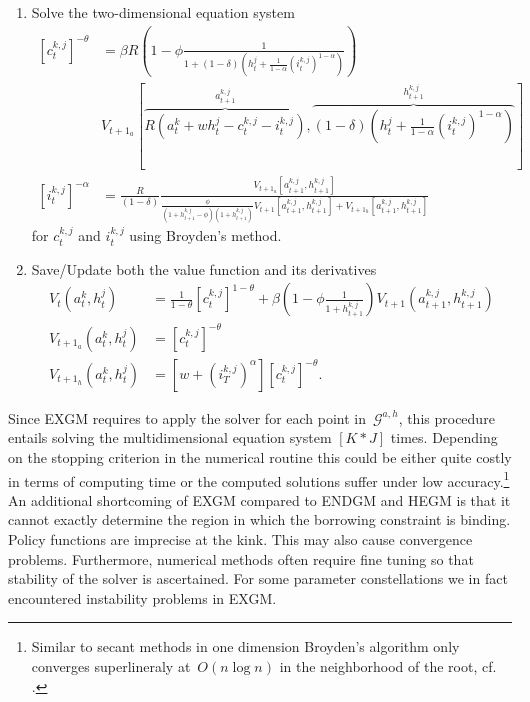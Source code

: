 \documentclass[a4paper,12pt]{article}%
\begin{document}
\begin{enumerate}
\begin{enumerate}
\item \label{EXGM interp}Solve the two-dimensional equation system
\begin{align*}
\left[  c_{t}^{k,j}\right]  ^{-\theta}  &  =\beta R\left(  1-\phi\frac
{1}{1+\left(  1-\delta\right)  \left(  h_{t}^{j}+\frac{1}{1-\alpha}\left(
i_{t}^{k,j}\right)  ^{1-\alpha}\right)  }\right) \\
&  \text{$V_{t+1_{a}}$}\left[  \overset{a_{t+1}^{k,j}}{\overbrace{R\left(
a_{t}^{k}+wh_{t}^{j}-c_{t}^{k,j}-i_{t}^{k,j}\right)  }},\overset{h_{t+1}%
^{k,j}}{\overbrace{\left(  1-\delta\right)  \left(  h_{t}^{j}+\frac
{1}{1-\alpha}\left(  i_{t}^{k,j}\right)  ^{1-\alpha}\right)  }}\right] \\
\left[  i_{t}^{k,j}\right]  ^{-\alpha}  &  =\frac{R}{\left(  1-\delta\right)
}\frac{\text{$V_{t+1_{a}}$}\left[  a_{t+1}^{k,j},h_{t+1}^{k,j}\right]  }%
{\frac{\phi}{\left(  1+h_{t+1}^{k,j}-\phi\right)  \left(  1+h_{t+1}%
^{k,j}\right)  }V_{t+1}\left[  a_{t+1}^{k,j},h_{t+1}^{k,j}\right]
+\text{$V_{t+1_{h}}$}\left[  a_{t+1}^{k,j},h_{t+1}^{k,j}\right]  }%
\end{align*}
for $c_{t}^{k,j}$ and $i_{t}^{k,j}$ using Broyden's method.

\item Save/Update both the value function and its derivatives%
\begin{align*}
V_{t}\left(  a_{t}^{k},h_{t}^{j}\right)   &  =\frac{1}{1-\theta}\left[
c_{t}^{k,j}\right]  ^{1-\theta}+\beta\left(  1-\phi\frac{1}{1+h_{t+1}^{k,j}%
}\right)  V_{t+1}(a_{t+1}^{k,j},h_{t+1}^{k,j})\\
\text{$V_{t+1_{a}}$}\left(  a_{t}^{k},h_{t}^{j}\right)   &  =\left[
c_{t}^{k,j}\right]  ^{-\theta}\\
\text{$V_{t+1_{h}}$}\left(  a_{t}^{k},h_{t}^{j}\right)   &  =\left[  w+
\left(  i_{T}^{k,j}\right)  ^{\alpha} \right]  \left[  c_{t}^{k,j}\right]
^{-\theta}\text{.}%
\end{align*}

\end{enumerate}
\end{enumerate}

Since EXGM requires to apply the solver for each point in~$\mathcal{G}^{a,h}$,
this procedure entails solving the multidimensional equation system $\left[
K\ast J\right]  $ times. Depending on the stopping criterion in the numerical
routine this could be either quite costly in terms of computing time or the
computed solutions suffer under low accuracy.\footnote{Similar to secant
methods in one dimension Broyden's algorithm only converges superlineraly
at~$O(n\log n)$ in the neighborhood of the root, cf.
%
.} An additional shortcoming of EXGM compared to ENDGM and HEGM is that it
cannot exactly determine the region in which the borrowing constraint is
binding. Policy functions are imprecise at the kink. This may also cause
convergence problems. Furthermore, numerical methods often require fine tuning
so that stability of the solver is ascertained. For some parameter
constellations we in fact encountered instability problems in EXGM.
\end{document}
